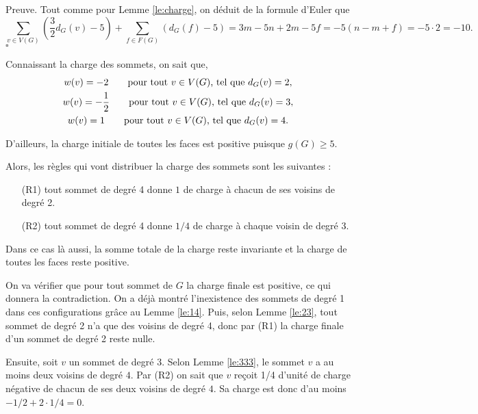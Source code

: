 \documentclass[10pt,a4paper]{article}
\newcommand{\ep}{{\hfill $\square$}}
\begin{document}
Preuve.
Tout comme pour Lemme \ref{le:charge}, on déduit de la formule d'Euler que
$$ 
\sum_{v \in V(G)} \left(\frac{3}{2}d_G(v) - 5\right) + \sum_{f\in F(G)} \left(d_G(f) -5\right) = 3m -5n + 2m - 5f = -5(n - m + f) = -5 \cdot 2 = -10.
$$
\ep 

Connaissant la charge des sommets, on sait que,
$$
\gathered
w(v) = -2 \qquad \textrm{pour tout $v \in V(G)$, tel que } d_G(v) = 2,\\
w(v) = -\frac{1}{2} \qquad \textrm{pour tout $v \in V(G)$, tel que } d_G(v) = 3,\\
w(v) =  1 \qquad \textrm{pour tout $v \in V(G)$, tel que } d_G(v) = 4.
\endgathered
$$

D'ailleurs, la charge initiale de toutes les faces est positive puisque $g(G) \geq 5$.

Alors, les règles qui vont distribuer la charge des sommets sont les suivantes :

\begin{enumerate}
\item[(R1)] tout sommet de degré 4 donne $1$ de charge à chacun de ses voisins de degré 2.
\item[(R2)] tout sommet de degré 4 donne $1/4$ de charge à chaque voisin de degré 3.
\end{enumerate}
Dans ce cas là aussi, la somme totale de la charge reste invariante et la charge de toutes les faces reste positive.

On va vérifier que pour tout sommet de $G$ la charge finale est positive, ce qui donnera la contradiction. On a déjà montré l'inexistence des sommets de degré 1 dans ces configurations grâce au Lemme \ref{le:14}. Puis, selon Lemme \ref{le:23}, tout sommet de degré 2 n'a que des voisins de degré 4, donc par (R1) la charge finale d'un sommet de degré 2 reste nulle.

Ensuite, soit $v$ un sommet de degré $3$. Selon Lemme \ref{le:333}, le sommet $v$ a au moins deux voisins de degré $4$. Par (R2) on sait que $v$ reçoit 1/4 d'unité de charge négative de chacun de ses deux voisins de degré $4$. Sa charge est donc d'au moins $-1/2+2\cdot 1/4 = 0$.

\end{document}
